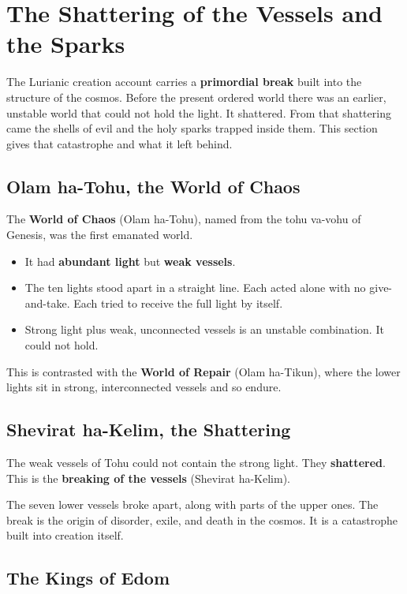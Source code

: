 \section{The Shattering of the Vessels and the Sparks}

The Lurianic creation account carries a \textbf{primordial break} built into the structure of the
cosmos. Before the present ordered world there was an earlier, unstable world that could not hold the
light. It shattered. From that shattering came the shells of evil and the holy sparks trapped inside
them. This section gives that catastrophe and what it left behind.

\subsection{Olam ha-Tohu, the World of Chaos}

The \textbf{World of Chaos} (Olam ha-Tohu), named from the tohu va-vohu of Genesis, was the
first emanated world.

\begin{itemize}
 \item It had \textbf{abundant light} but \textbf{weak vessels}.
 \item The ten lights stood apart in a straight line. Each acted alone with no give-and-take. Each
 tried to receive the full light by itself.
 \item Strong light plus weak, unconnected vessels is an unstable combination. It could not hold.
\end{itemize}

This is contrasted with the \textbf{World of Repair} (Olam ha-Tikun), where the lower lights sit in
strong, interconnected vessels and so endure.

\subsection{Shevirat ha-Kelim, the Shattering}

The weak vessels of Tohu could not contain the strong light. They \textbf{shattered}. This is the
\textbf{breaking of the vessels} (Shevirat ha-Kelim).

The seven lower vessels broke apart, along with parts of the upper ones. The break is the origin of
disorder, exile, and death in the cosmos. It is a catastrophe built into creation itself.

\subsection{The Kings of Edom}

